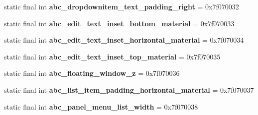 \begin{DoxyCompactItemize}
\item 
\hypertarget{classandroid_1_1support_1_1v7_1_1appcompat_1_1_r_1_1dimen_ad783efb42893731cf1f7f809ba1c0d5b}{}static final int {\bfseries abc\+\_\+dropdownitem\+\_\+text\+\_\+padding\+\_\+right} = 0x7f070032\label{classandroid_1_1support_1_1v7_1_1appcompat_1_1_r_1_1dimen_ad783efb42893731cf1f7f809ba1c0d5b}

\item 
\hypertarget{classandroid_1_1support_1_1v7_1_1appcompat_1_1_r_1_1dimen_ad747a841e96560a696e4012d696d2ac1}{}static final int {\bfseries abc\+\_\+edit\+\_\+text\+\_\+inset\+\_\+bottom\+\_\+material} = 0x7f070033\label{classandroid_1_1support_1_1v7_1_1appcompat_1_1_r_1_1dimen_ad747a841e96560a696e4012d696d2ac1}

\item 
\hypertarget{classandroid_1_1support_1_1v7_1_1appcompat_1_1_r_1_1dimen_ae52f73ef5d27d41b72d8a3e2cc9d2b5a}{}static final int {\bfseries abc\+\_\+edit\+\_\+text\+\_\+inset\+\_\+horizontal\+\_\+material} = 0x7f070034\label{classandroid_1_1support_1_1v7_1_1appcompat_1_1_r_1_1dimen_ae52f73ef5d27d41b72d8a3e2cc9d2b5a}

\item 
\hypertarget{classandroid_1_1support_1_1v7_1_1appcompat_1_1_r_1_1dimen_a8f3a30511f3e727e28bf89d5a1bbc5d3}{}static final int {\bfseries abc\+\_\+edit\+\_\+text\+\_\+inset\+\_\+top\+\_\+material} = 0x7f070035\label{classandroid_1_1support_1_1v7_1_1appcompat_1_1_r_1_1dimen_a8f3a30511f3e727e28bf89d5a1bbc5d3}

\item 
\hypertarget{classandroid_1_1support_1_1v7_1_1appcompat_1_1_r_1_1dimen_a69393494aeb17e1317ac34e42fc20862}{}static final int {\bfseries abc\+\_\+floating\+\_\+window\+\_\+z} = 0x7f070036\label{classandroid_1_1support_1_1v7_1_1appcompat_1_1_r_1_1dimen_a69393494aeb17e1317ac34e42fc20862}

\item 
\hypertarget{classandroid_1_1support_1_1v7_1_1appcompat_1_1_r_1_1dimen_a413d6f0f1c60575b7369e9e448283c02}{}static final int {\bfseries abc\+\_\+list\+\_\+item\+\_\+padding\+\_\+horizontal\+\_\+material} = 0x7f070037\label{classandroid_1_1support_1_1v7_1_1appcompat_1_1_r_1_1dimen_a413d6f0f1c60575b7369e9e448283c02}

\item 
\hypertarget{classandroid_1_1support_1_1v7_1_1appcompat_1_1_r_1_1dimen_ac1eb537985c0762039ad7dfc84d7a94f}{}static final int {\bfseries abc\+\_\+panel\+\_\+menu\+\_\+list\+\_\+width} = 0x7f070038\label{classandroid_1_1support_1_1v7_1_1appcompat_1_1_r_1_1dimen_ac1eb537985c0762039ad7dfc84d7a94f}


\end{DoxyCompactItemize}
